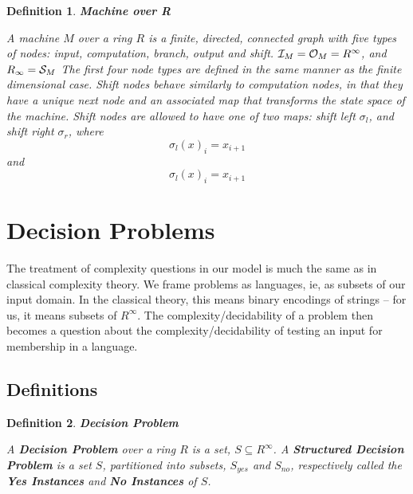 \documentclass[twoside]{article}
\newtheorem{definition}{Definition}[section]
\begin{document}
  
  \begin{definition}{\textbf{Machine over R}}

    A machine $M$ over a ring $R$ is a finite, directed, connected
    graph with five types of nodes: \emph{input, computation, branch,
      output} and \emph{shift}.  $\mathcal{I}_M = \mathcal{O}_M =
    R^\infty$, and $R_\infty = \mathcal{S}_M$ The first four node
    types are defined in the same manner as the finite dimensional
    case.  Shift nodes behave similarly to computation nodes, in that
    they have a unique next node and an associated map that transforms
    the state space of the machine.  Shift nodes are allowed to have
    one of two maps: \emph{shift left} $\sigma_l$, and \emph{shift
      right} $\sigma_r$, where\\

    $$\sigma_l(x)_i = x_{i+1}$$ and $$\sigma_l(x)_i = x_{i+1}$$
  \end{definition}
  

  \section{Decision Problems}

  The treatment of complexity questions in our model is much the same
  as in classical complexity theory.  We frame problems as languages,
  ie, as subsets of our input domain.  In the classical theory, this
  means binary encodings of strings -- for us, it means subsets of
  $R^\infty$.  The complexity/decidability of a problem then becomes a
  question about the complexity/decidability of testing an input for
  membership in a language.

  \subsection{Definitions}
  
  \begin{definition}{\textbf{Decision Problem}}
      
    A \textbf{Decision Problem} over a ring $R$ is a set, $S \subseteq
    R^\infty$.  A \textbf{Structured Decision Problem} is a set $S$,
    partitioned into subsets, $S_{yes}$ and $S_{no}$, respectively
    called the \textbf{Yes Instances} and \textbf{No Instances} of 
    $S$.
 
  \end{definition}
\end{document}
